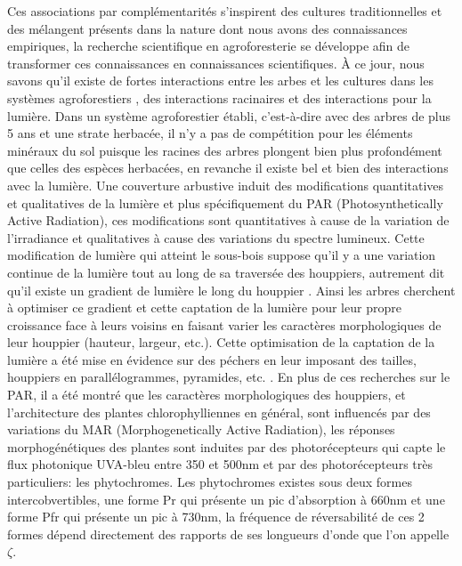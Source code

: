 ﻿\documentclass[12pt]{report}
\begin{document}
Ces associations par complémentarités s'inspirent des cultures traditionnelles
et des mélangent présents dans la nature dont nous avons des connaissances
empiriques, la recherche scientifique en agroforesterie se développe afin de
transformer ces connaissances en connaissances scientifiques. À ce jour, nous
savons qu'il existe de fortes interactions entre les arbes et les cultures dans
les systèmes agroforestiers \citep{AF_ref48,AF_ref49,AF_ref47},
des interactions racinaires et des interactions pour la lumière. Dans un système
agroforestier établi, c'est-à-dire avec des arbres de plus 5 ans et une strate
herbacée, il n'y a pas de compétition pour les éléments minéraux du sol puisque
les racines des arbres plongent bien plus profondément que celles des espèces
herbacées, en revanche il existe bel et bien des interactions avec la lumière.
Une couverture arbustive induit des modifications quantitatives et qualitatives
de la lumière\citep{MAR_ref36} et plus spécifiquement du PAR
(Photosynthetically Active Radiation), ces modifications sont quantitatives à
cause de la variation de l'irradiance et qualitatives à cause des variations du
spectre lumineux. Cette modification de lumière qui atteint le sous-bois suppose
qu'il y a une variation continue de la lumière tout au long de sa traversée des
houppiers, autrement dit qu'il existe un gradient de lumière le long du houppier
\citep{MAR_ref31,MAR_ref35}. Ainsi les arbres cherchent à optimiser ce
gradient et cette captation de la lumière pour leur propre croissance face à
leurs voisins \citep{MAR_ref52} en faisant varier les caractères morphologiques de leur
houppier (hauteur, largeur, etc.). Cette optimisation de la captation de la lumière a été mise
en évidence sur des péchers en leur imposant des tailles, houppiers en
parallélogrammes, pyramides, etc. \citep{MAR_ref26}. En plus de ces recherches
sur le PAR, il a été montré que les caractères morphologiques des houppiers, et
l'architecture des plantes chlorophylliennes en général, sont influencés par des
variations du MAR (Morphogenetically Active Radiation)\citep{MAR_ref35}, les réponses
morphogénétiques des plantes sont induites par des photorécepteurs qui capte le flux
photonique UVA-bleu entre 350 et 500nm et par des photorécepteurs très particuliers: les
phytochromes. Les phytochromes existes sous deux formes intercobvertibles, une
forme Pr qui présente un pic d'absorption à 660nm et une forme Pfr qui présente
un pic à 730nm, la fréquence de réversabilité de ces 2 formes dépend directement
des rapports de ses longueurs d'onde que l'on appelle $\zeta$.
\end{document}
